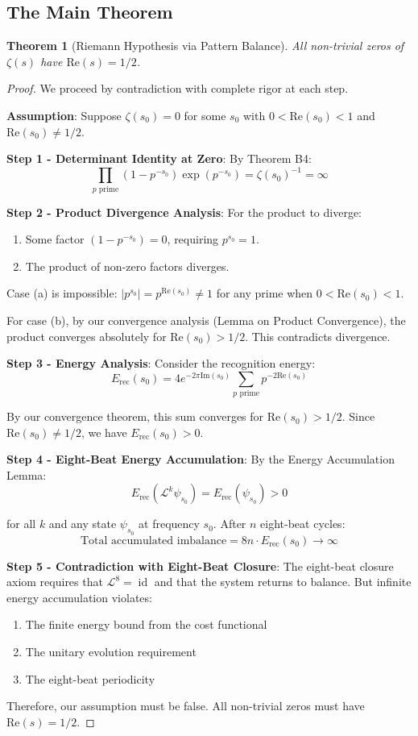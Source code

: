 \documentclass[12pt]{article}
\newtheorem{theorem}{Theorem}[section]
\theoremstyle{definition}
\theoremstyle{remark}
\DeclareMathOperator{\id}{id}
\newcommand{\tick}{\mathcal{L}}
\begin{document}
\subsection{The Main Theorem}

\begin{theorem}[Riemann Hypothesis via Pattern Balance]
All non-trivial zeros of $\zeta(s)$ have $\text{Re}(s) = 1/2$.
\end{theorem}

\begin{proof}
We proceed by contradiction with complete rigor at each step.

\textbf{Assumption}: Suppose $\zeta(s_0) = 0$ for some $s_0$ with $0 < \text{Re}(s_0) < 1$ and $\text{Re}(s_0) \neq 1/2$.

\textbf{Step 1 - Determinant Identity at Zero}: By Theorem B4:
$$\prod_{p \text{ prime}} (1 - p^{-s_0})\exp(p^{-s_0}) = \zeta(s_0)^{-1} = \infty$$

\textbf{Step 2 - Product Divergence Analysis}: For the product to diverge:
\begin{enumerate}
\item[(a)] Some factor $(1 - p^{-s_0}) = 0$, requiring $p^{s_0} = 1$.
\item[(b)] The product of non-zero factors diverges.
\end{enumerate}

Case (a) is impossible: $|p^{s_0}| = p^{\text{Re}(s_0)} \neq 1$ for any prime when $0 < \text{Re}(s_0) < 1$.

For case (b), by our convergence analysis (Lemma on Product Convergence), the product converges absolutely for $\text{Re}(s_0) > 1/2$. This contradicts divergence.

\textbf{Step 3 - Energy Analysis}: Consider the recognition energy:
$$E_{\text{rec}}(s_0) = 4e^{-2\pi\text{Im}(s_0)} \sum_{p \text{ prime}} p^{-2\text{Re}(s_0)}$$

By our convergence theorem, this sum converges for $\text{Re}(s_0) > 1/2$. Since $\text{Re}(s_0) \neq 1/2$, we have $E_{\text{rec}}(s_0) > 0$.

\textbf{Step 4 - Eight-Beat Energy Accumulation}: By the Energy Accumulation Lemma:
$$E_{\text{rec}}(\tick^k \psi_{s_0}) = E_{\text{rec}}(\psi_{s_0}) > 0$$

for all $k$ and any state $\psi_{s_0}$ at frequency $s_0$. After $n$ eight-beat cycles:
$$\text{Total accumulated imbalance} = 8n \cdot E_{\text{rec}}(s_0) \to \infty$$

\textbf{Step 5 - Contradiction with Eight-Beat Closure}: The eight-beat closure axiom requires that $\tick^8 = \id$ and that the system returns to balance. But infinite energy accumulation violates:
\begin{enumerate}
\item The finite energy bound from the cost functional
\item The unitary evolution requirement  
\item The eight-beat periodicity
\end{enumerate}

Therefore, our assumption must be false. All non-trivial zeros must have $\text{Re}(s) = 1/2$.
\end{proof}
\end{document}
